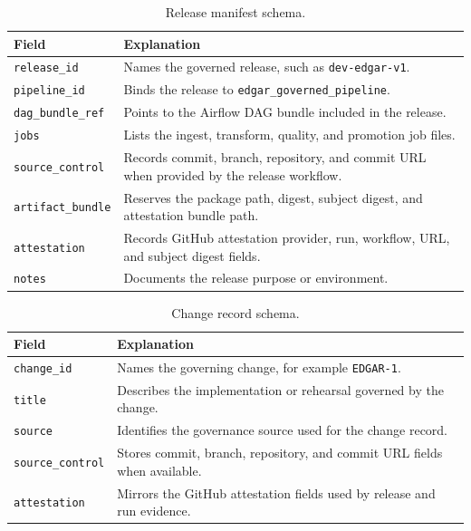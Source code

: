 \begin{table}[H]
  \centering
  \caption{Release manifest schema.}
  \label{tab:schema-release-manifest}
  \renewcommand{\arraystretch}{1.12}
  \begin{tabularx}{\textwidth}{@{}p{}X@{}}
    \toprule
    \textbf{Field} & \textbf{Explanation} \\
    \midrule
    \texttt{release\_id} & Names the governed release, such as \texttt{dev-edgar-v1}. \\
    \texttt{pipeline\_id} & Binds the release to \texttt{edgar\_governed\_pipeline}. \\
    \texttt{dag\_bundle\_ref} & Points to the Airflow DAG bundle included in the release. \\
    \texttt{jobs} & Lists the ingest, transform, quality, and promotion job files. \\
    \texttt{source\_control} & Records commit, branch, repository, and commit URL when provided by the release workflow. \\
    \texttt{artifact\_bundle} & Reserves the package path, digest, subject digest, and attestation bundle path. \\
    \texttt{attestation} & Records GitHub attestation provider, run, workflow, URL, and subject digest fields. \\
    \texttt{notes} & Documents the release purpose or environment. \\
    \bottomrule
  \end{tabularx}
\end{table}

\begin{table}[H]
  \centering
  \caption{Change record schema.}
  \label{tab:schema-change-record}
  \renewcommand{\arraystretch}{1.12}
  \begin{tabularx}{\textwidth}{@{}p{}X@{}}
    \toprule
    \textbf{Field} & \textbf{Explanation} \\
    \midrule
    \texttt{change\_id} & Names the governing change, for example \texttt{EDGAR-1}. \\
    \texttt{title} & Describes the implementation or rehearsal governed by the change. \\
    \texttt{source} & Identifies the governance source used for the change record. \\
    \texttt{source\_control} & Stores commit, branch, repository, and commit URL fields when available. \\
    \texttt{attestation} & Mirrors the GitHub attestation fields used by release and run evidence. \\
    \bottomrule
  \end{tabularx}
\end{table}

